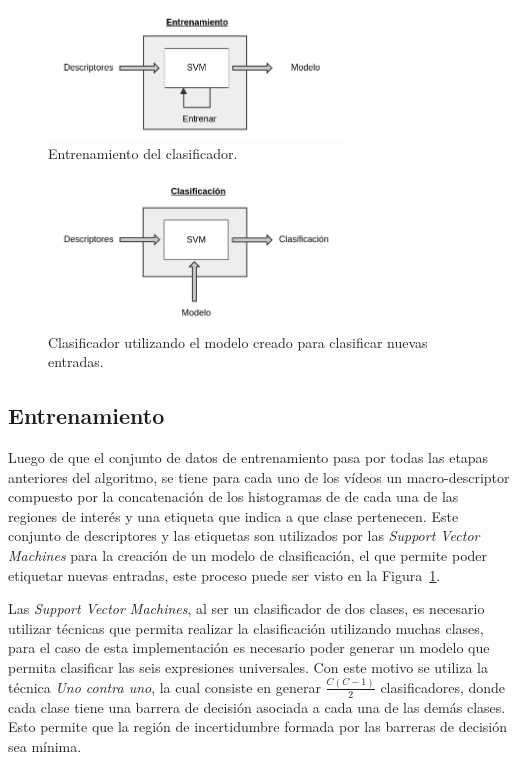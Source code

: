 		
	\begin{figure}[bt]
		\centering
  		\label{algoritmo:fig:entrenamiento}
    		\includegraphics[width=0.7\textwidth]{Figuras/Diagramas/Entrenamiento.png}
  		\caption{Entrenamiento del clasificador.}
	\end{figure}	
	
	\begin{figure}[bt]
		\centering
  		\label{algoritmo:fig:clasificacion}
    		\includegraphics[width=0.7\textwidth]{Figuras/Diagramas/Clasificacion.png}
  		\caption{Clasificador utilizando el modelo creado para clasificar nuevas entradas.}
	\end{figure}	
		
	


	\subsection{Entrenamiento}
	\label{algoritmo:entrenamiento}
		Luego de que el conjunto de datos de entrenamiento pasa por todas las etapas anteriores del algoritmo, se tiene para cada uno de los vídeos un macro-descriptor compuesto por la concatenación de los histogramas de de cada una de las regiones de interés y una etiqueta que indica a que clase pertenecen. Este conjunto de descriptores y las etiquetas son utilizados por las \textit{Support Vector Machines} para la creación de un modelo de clasificación, el que permite poder etiquetar nuevas entradas, este proceso puede ser visto en la Figura~\ref{algoritmo:fig:entrenamiento}.
	
	Las \textit{Support Vector Machines}, al ser un clasificador de dos clases, es necesario utilizar técnicas que permita realizar la clasificación utilizando muchas clases, para el caso de esta implementación es necesario poder generar un modelo que permita clasificar las seis expresiones universales. Con este motivo se utiliza la técnica \textit{Uno contra uno}, la cual consiste en generar $\frac{C(C-1)}{2}$ clasificadores, donde cada clase tiene una barrera de decisión asociada a cada una de las demás clases. Esto permite que la región de incertidumbre formada por las barreras de decisión sea mínima.
			

